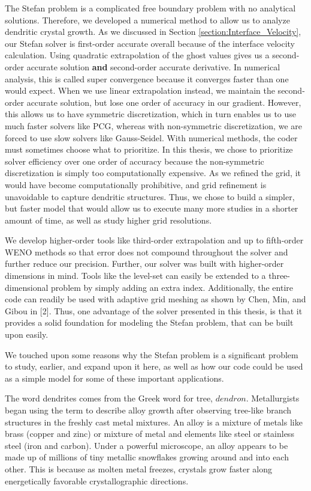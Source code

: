\documentclass[oneside,12pt,final]{/Applications/TeX/packages/ucthesis-CA2012}
\begin{document}
\begin{mainmatter}
The Stefan problem is a complicated free boundary problem with no analytical solutions. Therefore, we developed a numerical method to allow us to analyze dendritic crystal growth. As we discussed in Section \ref{section:Interface_Velocity}, our Stefan solver is first-order accurate overall because of the interface velocity calculation. Using quadratic extrapolation of the ghost values gives us a second-order accurate solution \textbf{and} second-order accurate derivative. In numerical analysis, this is called super convergence because it converges faster than one would expect. When we use linear extrapolation instead, we maintain the second-order accurate solution, but lose one order of accuracy in our gradient. However, this allows us to have symmetric discretization, which in turn enables us to use much faster solvers like PCG, whereas with non-symmetric discretization, we are forced to use slow solvers like Gauss-Seidel. With numerical methods, the coder must sometimes choose what to prioritize. In this thesis, we chose to prioritize solver efficiency over one order of accuracy because the non-symmetric discretization is simply too computationally expensive. As we refined the grid, it would have become computationally prohibitive, and grid refinement is unavoidable to capture dendritic structures. Thus, we chose to build a simpler, but faster model that would allow us to execute many more studies in a shorter amount of time, as well as study higher grid resolutions.

We develop higher-order tools like third-order extrapolation and up to fifth-order WENO methods so that error does not compound throughout the solver and further reduce our precision. Further, our solver was built with higher-order dimensions in mind. Tools like the level-set can easily be extended to a three-dimensional problem by simply adding an extra index. Additionally, the entire code can readily be used with adaptive grid meshing as shown by Chen, Min, and Gibou in [2]. Thus, one advantage of the solver presented in this thesis, is that it provides a solid foundation for modeling the Stefan problem, that can be built upon easily.

We touched upon some reasons why the Stefan problem is a significant problem to study, earlier, and expand upon it here, as well as how our code could be used as a simple model for some of these important applications.

The word dendrites comes from the Greek word for tree, $dendron$. Metallurgists began using the term to describe alloy growth after observing tree-like branch structures in the freshly cast metal mixtures. An alloy is a mixture of metals like brass (copper and zinc) or mixture of metal and elements like steel or stainless steel (iron and carbon). Under a powerful microscope, an alloy appears to be made up of millions of tiny metallic snowflakes growing around and into each other. This is because as molten metal freezes, crystals grow faster along energetically favorable crystallographic directions. 


\end{mainmatter}
\end{document}
